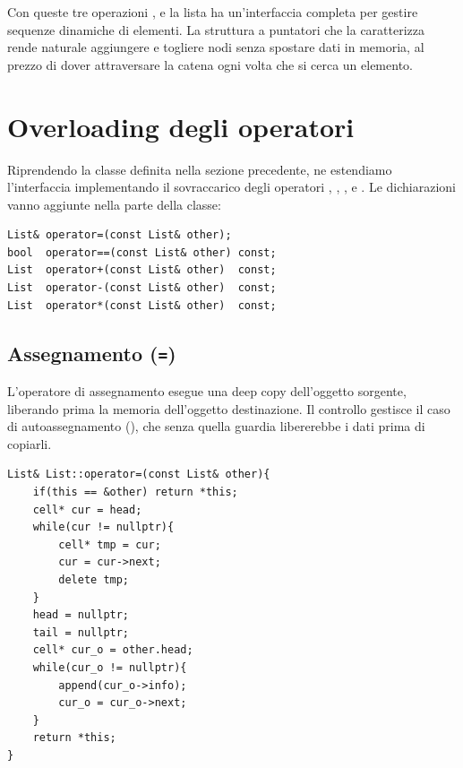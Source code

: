 Con queste tre operazioni  ,  e   la lista ha un'interfaccia completa per gestire sequenze dinamiche di elementi. La struttura a puntatori che la caratterizza rende naturale aggiungere e togliere nodi senza spostare dati in memoria, al prezzo di dover attraversare la catena ogni volta che si cerca un elemento.


\section{Overloading degli operatori}


Riprendendo la classe  definita nella sezione precedente, ne estendiamo l'interfaccia implementando il sovraccarico degli operatori \inlinecode{=}, \inlinecode{==}, \inlinecode{+}, \inlinecode{-} e \inlinecode{*}. Le dichiarazioni vanno aggiunte nella parte  della classe:

\begin{codebox}
    \begin{lstlisting}
List& operator=(const List& other);
bool  operator==(const List& other) const;
List  operator+(const List& other)  const;
List  operator-(const List& other)  const;
List  operator*(const List& other)  const;
    \end{lstlisting}
\end{codebox}

\subsection{Assegnamento (\texttt{=})}
L'operatore di assegnamento esegue una deep copy dell'oggetto sorgente, liberando prima la memoria dell'oggetto destinazione. Il controllo  gestisce il caso di autoassegnamento (), che senza quella guardia libererebbe i dati prima di copiarli.

\begin{codebox}
    \begin{lstlisting}
List& List::operator=(const List& other){
    if(this == &other) return *this;
    cell* cur = head;
    while(cur != nullptr){
        cell* tmp = cur;
        cur = cur->next;
        delete tmp;
    }
    head = nullptr;
    tail = nullptr;
    cell* cur_o = other.head;
    while(cur_o != nullptr){
        append(cur_o->info);
        cur_o = cur_o->next;
    }
    return *this;
}
    \end{lstlisting}
\end{codebox}

